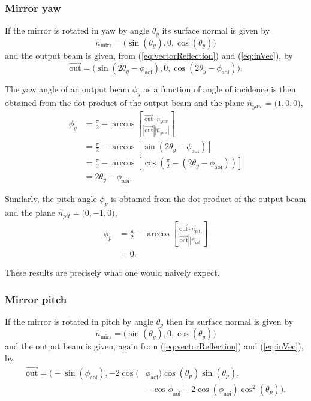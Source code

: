 \documentclass[12pt]{article}
\newcommand{\threeVec}[3]{\big( {#1}, {#2}, {#3} \big)}
\newcommand{\myVec}[1]{\vec{#1}}
\begin{document}
\subsubsection{Mirror yaw}
If the mirror is rotated in yaw by angle $\theta_y$ its surface normal
is given by
\begin{equation}
  \hat{n}_\mathrm{mirr} = \big(\sin(\theta_y),0,\cos(\theta_y)\big)
\end{equation}
and the output beam is given, from (\ref{eq:vectorReflection}) and
(\ref{eq:inVec}), by
\begin{equation}
  \myVec{\mathrm{out}} = \threeVec{\sin(2\theta_y-\phi_\mathrm{aoi})}{0}{\cos(2\theta_y-\phi_\mathrm{aoi})}.
\end{equation}

The yaw angle of an output beam $\phi_y$ as a function of angle of
incidence is then obtained from the dot product of the output beam and
the plane $\hat{n}_{yaw}=\threeVec{1}{0}{0}$,
\begin{align}
  \phi_y &= \frac{\pi}{2} - \arccos\left[\frac{\myVec{\mathrm{out}}\cdot\hat{n}_{yaw}}{|\myVec{\mathrm{out}}||\hat{n}_{yaw}|}\right]\\
  &=\frac{\pi}{2} - \arccos\left[ \sin(2\theta_y-\phi_\mathrm{aoi}) \right]\\
  &=\frac{\pi}{2} - \arccos\left[ \cos\left(\frac{\pi}{2}-(2\theta_y-\phi_\mathrm{aoi})\right) \right]\\
&=2\theta_y-\phi_\mathrm{aoi}.
\end{align}

Similarly, the pitch angle $\phi_p$ is obtained from the dot product
of the output beam and the plane $\hat{n}_{pit}=\threeVec{0}{-1}{0}$,
\begin{align}
  \phi_p &= \frac{\pi}{2} - \arccos\left[\frac{\myVec{\mathrm{out}}\cdot\hat{n}_{pit}}{|\myVec{\mathrm{out}}||\hat{n}_{pit}|}\right]\\
  &=0.
\end{align}

These results are precisely what one would naively expect.

\subsubsection{Mirror pitch}
If the mirror is rotated in pitch by angle $\theta_p$ then its surface
normal is given by
\begin{equation}
  \hat{n}_\mathrm{mirr} = \threeVec{\sin(\theta_y)}{0}{\cos(\theta_y)}
\end{equation}
and the output beam is given, again from (\ref{eq:vectorReflection})
and (\ref{eq:inVec}), by
\begin{align}
  \myVec{\mathrm{out}} = \big(-\sin(\phi_\mathrm{aoi}),-2\cos(&\phi_\mathrm{aoi})\cos(\theta_p)\sin(\theta_p),\nonumber\\
&-\cos{\phi_\mathrm{aoi}}+2\cos(\phi_\mathrm{aoi})\cos^2(\theta_p)\big).
\end{align}
\end{document}
